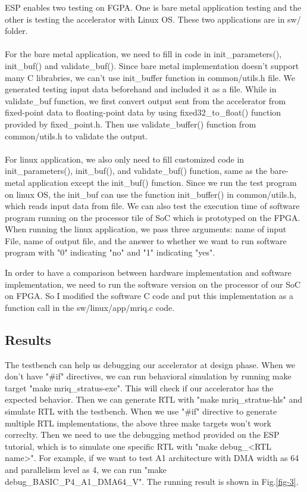 ESP enables two testing on FGPA. One is bare metal application testing and the
other is testing the accelerator with Linux OS. These two applications are in
sw/ folder. \\ \\ For the bare metal application, we need to fill in code in
init\_parameters(), init\_buf() and validate\_buf(). Since bare metal
implementation doesn't support many C librabries, we can't use init\_buffer
function in common/utils.h file. We generated testing input data beforehand and
included it as a file. While in validate\_buf function, we first convert output
sent from the accelerator from fixed-point data to floating-point data by using
fixed32\_to\_float() function provided by fixed\_point.h. Then use
validate\_buffer() function from common/utils.h to validate the
output. \\ \\ For linux application, we also only need to fill customized code
in init\_parameters(), init\_buf(), and validate\_buf() function, same as the
bare-metal application except the init\_buf() function. Since we run the test
program on linux OS, the init\_buf can use the function init\_buffer() in
common/utils.h, which reads input data from file. We can also test the execution
time of software program running on the processor tile of SoC which is
prototyped on the FPGA. When running the linux application, we pass three
arguments: name of input File, name of output file, and the answer to whether we
want to run software program with "0" indicating "no" and "1" indicating "yes".


In order to have a comparison between hardware implementation and software
implementation, we need to run the software version on the processor of our SoC
on FPGA. So I modified the software C code and put this implementation as a
function call in the sw/linux/app/mriq.c code.\\


\subsection{Results}

The testbench can help us debugging our accelerator at design phase. When we
don't have "\#if" directives, we can run behavioral simulation by running make
target "make mriq\_stratus-exe". This will check if our accelerator has the
expected behavior. Then we can generate RTL with "make mriq\_stratus-hls" and
simulate RTL with the testbench. When we use "\#if" directive to generate
multiple RTL implementations, the above three make targets won't work
correclty. Then we need to use the debugging method provided on the ESP
tutorial, which is to simulate one specific RTL with "make debug\_<RTL
name>". For example, if we want to test A1 architecture with DMA width as 64 and
parallelism level as 4, we can run "make debug\_BASIC\_P4\_A1\_DMA64\_V". The
running result is shown in Fig.\ref{fig-3}.  \\

